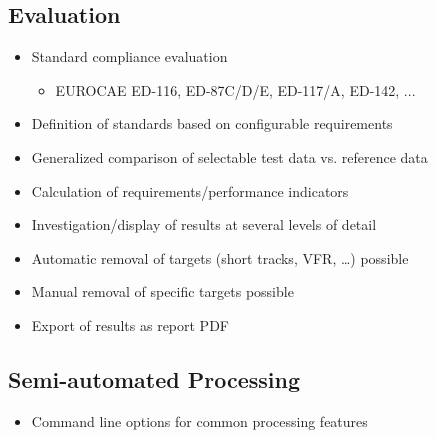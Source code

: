 \subsection{Evaluation}    
\begin{itemize}  
    \item Standard compliance evaluation
        \begin{itemize}  
            \item EUROCAE ED-116, ED-87C/D/E, ED-117/A, ED-142, ...
        \end{itemize}  
    \item Definition of standards based on configurable requirements
    \item Generalized comparison of selectable test data vs. reference data
    \item Calculation of requirements/performance indicators
    \item Investigation/display of results at several levels of detail
    \item Automatic removal of targets (short tracks, VFR, …) possible
    \item Manual removal of specific targets possible
    \item Export of results as report PDF
\end{itemize}

\subsection{Semi-automated Processing}    
\begin{itemize}  
    \item Command line options for common processing features
\end{itemize}

